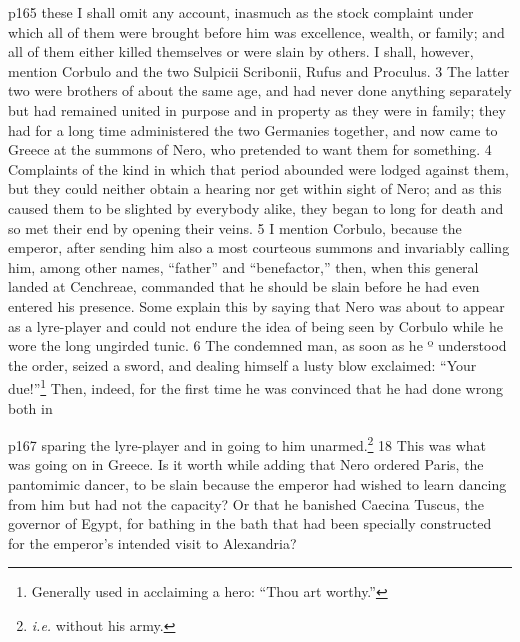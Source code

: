 p165 these I shall omit any account, inasmuch as the stock complaint under which all of them were brought before him was excellence, wealth, or family; and all of them either killed themselves or were slain by others. I shall, however, mention Corbulo and the two Sulpicii Scribonii, Rufus and Proculus. 3 The latter two were brothers of about the same age, and had never done anything separately but had remained united in purpose and in property as they were in family; they had for a long time administered the two Germanies together, and now came to Greece at the summons of Nero, who pretended to want them for something. 4 Complaints of the kind in which that period abounded were lodged against them, but they could neither obtain a hearing nor get within sight of Nero; and as this caused them to be slighted by everybody alike, they began to long for death and so met their end by opening their veins. 5 I mention Corbulo, because the emperor, after sending him also a most courteous summons and invariably calling him, among other names, ``father'' and ``benefactor,'' then, when this general landed at Cenchreae, commanded that he should be slain before he had even entered his presence. Some explain this by saying that Nero was about to appear as a lyre-player and could not endure the idea of being seen by Corbulo while he wore the long ungirded tunic. 6 The condemned man, as soon as he º understood the order, seized a sword, and dealing himself a lusty blow exclaimed: ``Your due!''\texthebrew{⁠}\footnote{Generally used in acclaiming a hero: ``Thou art worthy.''

} Then, indeed, for the first time he was convinced that he had done wrong both in

p167 sparing the lyre-player and in going to him unarmed.\texthebrew{⁠}\footnote{\emph{i.e.} without his army.

} 18 This was what was going on in Greece. Is it worth while adding that Nero ordered Paris, the pantomimic dancer, to be slain because the emperor had wished to learn dancing from him but had not the capacity? Or that he banished Caecina Tuscus, the governor of Egypt, for bathing in the bath that had been specially constructed for the emperor's intended visit to Alexandria?

